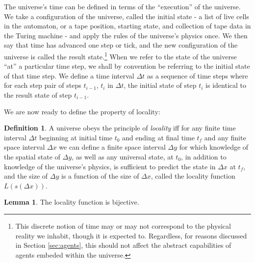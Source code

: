 \documentclass[12pt]{article}
\theoremstyle{definition}
\newtheorem{defn}{Definition}
\newtheorem{lem}{Lemma}
\begin{document}
The universe's time can be defined in terms of the ``execution'' of the
universe. We take a configuration of the universe, called the initial state - a
list of live cells in the automaton, or a tape position, starting state, and
collection of tape data in the Turing machine - and apply the rules of the
universe's physics once. We then say that time has advanced one step or tick,
and the new configuration of the universe is called the result
state.\footnote{This discrete notion of time may or may not correspond to the
physical reality we inhabit, though it is expected to. Regardless, for reasons
discussed in Section \ref{sec:agents}, this should not affect the abstract
capabilities of agents embeded within the universe.} When we refer to the state
of the universe ``at'' a particular time step, we shall by convention be
referring to the initial state of that time step. We define a time interval
\(\Delta t\) as a sequence of time steps where for each step pair of steps
\(t_{i-1}\), \(t_i\) in \(\Delta t\), the initial state of step \(t_i\) is
identical to the result state of step \(t_{i-1}\).



We are now ready to define the property of locality:

\begin{defn}

   A universe obeys the principle of \textit{locality} iff for any finite time
   interval \(\Delta t\) beginning at initial time \(t_0\) and ending at final
   time \(t_f\) and any finite space interval \(\Delta x\) we can define a
   finite space interval \(\Delta y\) for which knowledge of the spatial state
   of \(\Delta y\), as well as any universal state, at \(t_0\), in addition to
   knowledge of the universe's physics, is sufficient to predict the state in
   \(\Delta x\) at \(t_f\), and the size of \(\Delta y\) is a function of the
   size of \(\Delta x\), called the locality function \(L(s(\Delta x))\).

\end{defn}

\begin{lem}
   The locality function is bijective.
\end{lem}
\end{document}
